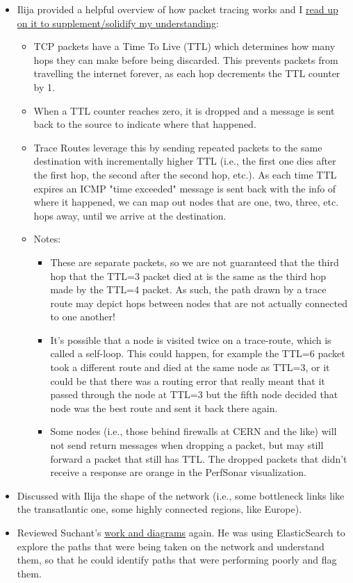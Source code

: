 \documentclass{weeklyreport}
\begin{document}
\begin{itemize}
    \item Ilija provided a helpful overview of how packet tracing works and I \href{http://users.cs.cf.ac.uk/Dave.Marshall/Internet/node77.html}{read up on it to supplement/solidify my understanding}:
	\begin{itemize}
		\item TCP packets have a Time To Live (TTL) which determines how many hops they can make before being discarded. This prevents packets from travelling the internet forever, as each hop decrements the TTL counter by 1.
		\item When a TTL counter reaches zero, it is dropped and a message is sent back to the source to indicate where that happened.
		\item Trace Routes leverage this by sending repeated packets to the same destination with incrementally higher TTL (i.e., the first one dies after the first hop, the second after the second hop, etc.). As each time TTL expires an ICMP "time exceeded" message is sent back with the info of where it happened, we can map out nodes that are one, two, three, etc. hops away, until we arrive at the destination.
		\item Notes:
		\begin{itemize}
			\item These are separate packets, so we are not guaranteed that the third hop that the TTL=3 packet died at is the same as the third hop made by the TTL=4 packet. As such, the path drawn by a trace route may depict hops between nodes that are not actually connected to one another!
			\item It's possible that a node is visited twice on a trace-route, which is called a self-loop. This could happen, for example the TTL=6 packet took a different route and died at the same node as TTL=3, or it could be that there was a routing error that really meant that it passed through the node at TTL=3 but the fifth node decided that node was the best route and sent it back there again.
			\item Some nodes (i.e., those behind firewalls at CERN and the like) will not send return messages when dropping a packet, but may still forward a packet that still has TTL. The dropped packets that didn't receive a response are orange in the PerfSonar visualization.
		\end{itemize}
	\end{itemize}
	\item Discussed with Ilija the shape of the network (i.e., some bottleneck links like the transatlantic one, some highly connected regions, like Europe).
    \item Reviewed Suchant's \href{https://docs.google.com/presentation/d/1XBkRZPMpXt2LNcMdrFH1u8UH91dsFsn_SKXPIySYsxw/edit#slide=id.p}{work and diagrams} again. He was using ElasticSearch to explore the paths that were being taken on the network and understand them, so that he could identify paths that were performing poorly and flag them.
\end{itemize}
\end{document}
